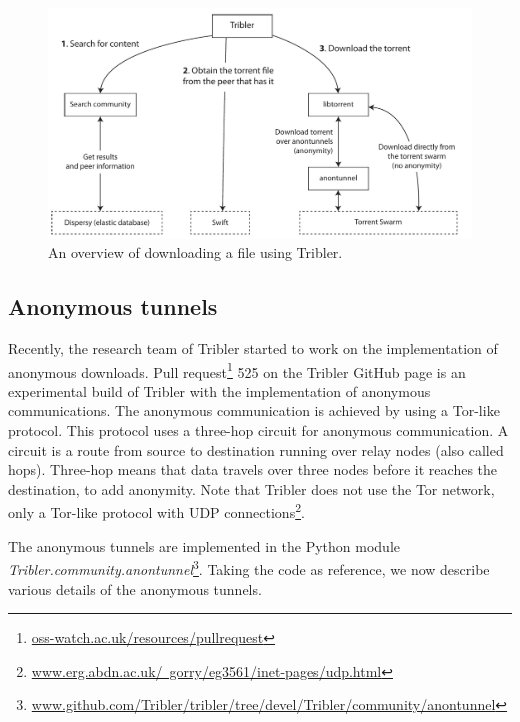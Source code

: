 		\begin{figure}[!htb]
			\centering
			\includegraphics[width=\textwidth]{graphics/tribler-overview.pdf}
			\caption{An overview of downloading a file using Tribler.}
			\label{fig:tribleroverview}
		\end{figure}
	
	\subsection{Anonymous tunnels}
		\label{sec:anonymoustunnels}
			Recently, the research team of Tribler started to work on the implementation of anonymous downloads. Pull request\footnote{\href{http://oss-watch.ac.uk/resources/pullrequest}{oss-watch.ac.uk/resources/pullrequest}} 525 on the Tribler GitHub page \cite{pullrequest525} is an experimental build of Tribler with the implementation of anonymous communications. The anonymous communication is achieved by using a Tor-like protocol. This protocol uses a three-hop circuit for anonymous communication. A circuit is a route from source to destination running over relay nodes (also called hops). Three-hop means that data travels over three nodes before it reaches the destination, to add anonymity. Note that Tribler does not use the Tor network, only a Tor-like protocol with UDP connections\footnote{\href{http://www.erg.abdn.ac.uk/~gorry/eg3561/inet-pages/udp.html}{www.erg.abdn.ac.uk/~gorry/eg3561/inet-pages/udp.html}}.
			
			The anonymous tunnels are implemented in the Python module \emph{Tribler.community.anontunnel}\footnote{\href{https://github.com/Tribler/tribler/tree/devel/Tribler/community/anontunnel}{www.github.com/Tribler/tribler/tree/devel/Tribler/community/anontunnel}}. Taking the code as reference, we now describe various details of the anonymous tunnels.
			

